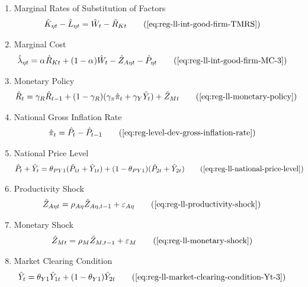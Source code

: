 \documentclass[../thesis.tex]{subfiles}
\begin{document}
{\begin{itemize}
\begin{enumerate}
		\item Marginal Rates of Substitution of Factors
		\begin{align}
			\hat{K}_{\eta t} - \hat{L}_{\eta t} &= \hat{W}_{t} - \hat{R}_{K t} \tag{\ref{eq:reg-ll-int-good-firm-TMRS}}
		\end{align}
		
		\item Marginal Cost
		\begin{alignat}{2}
			\hat{\lambda}_{\eta t} &= {\alpha_{}} \hat{R}_{Kt} + (1- {\alpha_{}}) \hat{W}_{t} - \hat{Z}_{A\eta t} - \hat{P}_{\eta t} \tag{\ref{eq:reg-ll-int-good-firm-MC-3}}
		\end{alignat}
		
		\item Monetary Policy
		\begin{align}
			& \hat{R}_t = \gamma_R \hat{R}_{t-1} + (1-\gamma_R)(\gamma_\pi \hat{\pi}_t + \gamma_Y \hat{Y}_t) + \hat{Z}_{Mt} \tag{\ref{eq:reg-ll-monetary-policy}}
		\end{align}
		
		\item National Gross Inflation Rate
		\begin{align}
			\hat{\pi}_{t} &= \hat{P}_{t} - \hat{P}_{t-1} \tag{\ref{eq:reg-level-dev-gross-inflation-rate}}
		\end{align}
		
		\item National Price Level
		\begin{alignat}{2}
			\hat{P}_{t} + \hat{Y}_{t} &= \theta_{PY1} (\hat{P}_{1t} + \hat{Y}_{1t}) + (1-\theta_{PY1}) (\hat{P}_{2t} + \hat{Y}_{2t}) \tag{\ref{eq:reg-ll-national-price-level}}
		\end{alignat}
		
		\item Productivity Shock
		\begin{alignat}{2}
			\hat{Z}_{A\eta t} &= \rho_{A\eta} \hat{Z}_{A\eta, t-1} + \varepsilon_{A\eta} \tag{\ref{eq:reg-ll-productivity-shock}}
		\end{alignat}
		
		\item Monetary Shock
		\begin{alignat}{2}
			\hat{Z}_{Mt} &= \rho_M \hat{Z}_{M,t-1} + \varepsilon_{M} \tag{\ref{eq:reg-ll-monetary-shock}}
		\end{alignat}
		
		\item Market Clearing Condition
		\begin{align}
			\hat{Y}_{t} &= \theta_{Y1} \hat{Y}_{1t} + (1-\theta_{Y1}) \hat{Y}_{2t} \tag{\ref{eq:reg-ll-market-clearing-condition-Yt-3}}
		\end{align}
		

\end{enumerate}
\end{itemize}}
\end{document}
